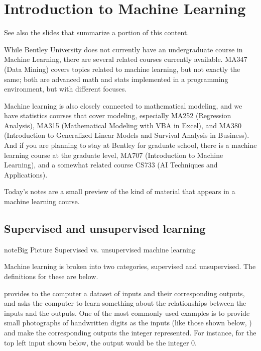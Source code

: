 \documentclass[letterpaper,10pt,english]{sphinxmanual}
\begin{document}
\chapter{Introduction to Machine Learning}
\label{\detokenize{chapter-17-machine-learning:introduction-to-machine-learning}}\label{\detokenize{chapter-17-machine-learning::doc}}
See also the slides that summarize a portion of this content.

While Bentley University does not currently have an undergraduate course in Machine Learning, there are several related courses currently available.  MA347 (Data Mining) covers topics related to machine learning, but not exactly the same; both are advanced math and stats implemented in a programming environment, but with different focuses.

Machine learning is also closely connected to mathematical modeling, and we have statistics courses that cover modeling, especially MA252 (Regression Analysis), MA315 (Mathematical Modeling with VBA in Excel), and MA380 (Introduction to Generalized Linear Models and Survival Analysis in Business).  And if you are planning to stay at Bentley for graduate school, there is a machine learning course at the graduate level, MA707 (Introduction to Machine Learning), and a somewhat related course CS733 (AI Techniques and Applications).

Today’s notes are a small preview of the kind of material that appears in a machine learning course.


\section{Supervised and unsupervised learning}
\label{\detokenize{chapter-17-machine-learning:supervised-and-unsupervised-learning}}
\begin{sphinxadmonition}{note}{Big Picture \sphinxhyphen{} Supervised vs. unsupervised machine learning}

Machine learning is broken into two categories, supervised and unsupervised.  The definitions for these are below.
\end{sphinxadmonition}

 provides to the computer a dataset of inputs and their corresponding outputs, and asks the computer to learn something about the relationships between the inputs and the outputs.  One of the most commonly used examples is to provide small photographs of handwritten digits as the inputs (like those shown below, ) and make the corresponding outputs the integer represented.  For instance, for the top left input shown below, the output would be the integer 0.
\end{document}
